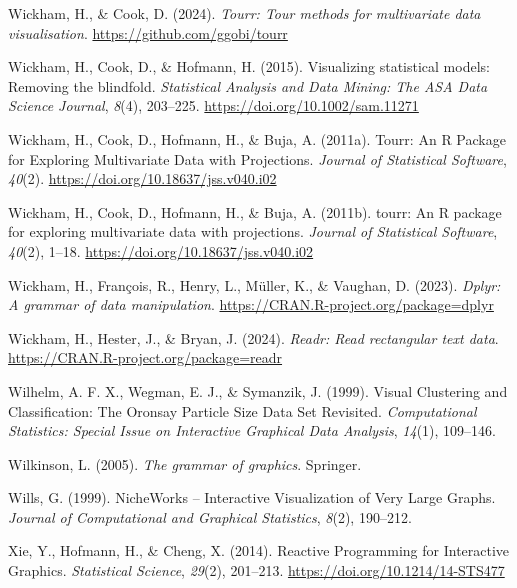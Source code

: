 \documentclass[
  letterpaper,
]{krantz}
\newlength{\cslhangindent}
\newenvironment{CSLReferences}[2] %
 {\begin{list}{}{%
  \setlength{\itemindent}{0pt}
  \setlength{\leftmargin}{0pt}
  \setlength{\parsep}{0pt}
  \ifodd #1
   \setlength{\leftmargin}{\cslhangindent}
   \setlength{\itemindent}{-1\cslhangindent}
  \fi
  \setlength{\itemsep}{#2\baselineskip}}}
 {\end{list}}
\begin{document}
\begin{CSLReferences}{1}{0}
Wickham, H., \& Cook, D. (2024). \emph{Tourr: Tour methods for
multivariate data visualisation}. \url{https://github.com/ggobi/tourr}

Wickham, H., Cook, D., \& Hofmann, H. (2015). Visualizing statistical
models: Removing the blindfold. \emph{Statistical Analysis and Data
Mining: The ASA Data Science Journal}, \emph{8}(4), 203--225.
\url{https://doi.org/10.1002/sam.11271}

Wickham, H., Cook, D., Hofmann, H., \& Buja, A. (2011a). Tourr: {An} {R}
{Package} for {Exploring} {Multivariate} {Data} with {Projections}.
\emph{Journal of Statistical Software}, \emph{40}(2).
\url{https://doi.org/10.18637/jss.v040.i02}

Wickham, H., Cook, D., Hofmann, H., \& Buja, A. (2011b). {tourr}: An {R}
package for exploring multivariate data with projections. \emph{Journal
of Statistical Software}, \emph{40}(2), 1--18.
\url{https://doi.org/10.18637/jss.v040.i02}

Wickham, H., François, R., Henry, L., Müller, K., \& Vaughan, D. (2023).
\emph{Dplyr: A grammar of data manipulation}.
\url{https://CRAN.R-project.org/package=dplyr}

Wickham, H., Hester, J., \& Bryan, J. (2024). \emph{Readr: Read
rectangular text data}. \url{https://CRAN.R-project.org/package=readr}

Wilhelm, A. F. X., Wegman, E. J., \& Symanzik, J. (1999). Visual
{C}lustering and {C}lassification: {T}he {O}ronsay {P}article {S}ize
{D}ata {S}et {R}evisited. \emph{Computational Statistics: Special Issue
on Interactive Graphical Data Analysis}, \emph{14}(1), 109--146.

Wilkinson, L. (2005). \emph{The grammar of graphics}. Springer.

Wills, G. (1999). NicheWorks -- {I}nteractive {V}isualization of {V}ery
{L}arge {G}raphs. \emph{Journal of Computational and Graphical
Statistics}, \emph{8}(2), 190--212.

Xie, Y., Hofmann, H., \& Cheng, X. (2014). {Reactive Programming for
Interactive Graphics}. \emph{Statistical Science}, \emph{29}(2),
201--213. \url{https://doi.org/10.1214/14-STS477}


\end{CSLReferences}
\end{document}
